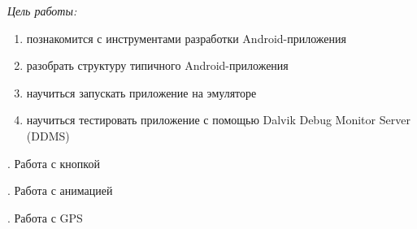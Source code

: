 \documentclass[pscyr,nonums]{hedlab}
\begin{document}
    \makeheader
    \lstset{language=java, basicstyle=\tiny}

    \noindent\emph{Цель работы:} 
    \begin{enumerate}
        \item познакомится с инструментами разработки Android-приложения
        \item разобрать структуру типичного Android-приложения
        \item научиться запускать приложение на эмуляторе
        \item научиться тестировать приложение с помощью Dalvik Debug Monitor Server (DDMS)
    \end{enumerate}

    . Работа с кнопкой
    

    \pagebreak

    . Работа с анимацией
    

    . Работа с GPS
    
\end{document}
